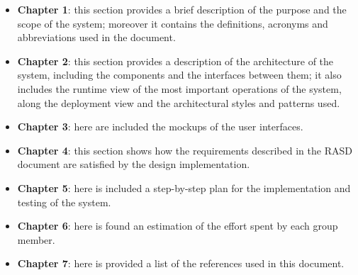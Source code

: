 \begin{itemize}
    \item \textbf{Chapter 1}: this section provides a brief description of the purpose and the scope of the system; moreover it contains the definitions, acronyms and abbreviations used in the document.
    \item \textbf{Chapter 2}: this section provides a description of the architecture of the system, including the components and the interfaces between them; it also includes the runtime view of the most important operations of the system, along the deployment view and the architectural styles and patterns used.
    \item \textbf{Chapter 3}: here are included the mockups of the user interfaces.
    \item \textbf{Chapter 4}: this section shows how the requirements described in the RASD document are satisfied by the design implementation.
    \item \textbf{Chapter 5}: here is included a step-by-step plan for the implementation and testing of the system.
    \item \textbf{Chapter 6}: here is found an estimation of the effort spent by each group member.
    \item \textbf{Chapter 7}: here is provided a list of the references used in this document.
\end{itemize}

